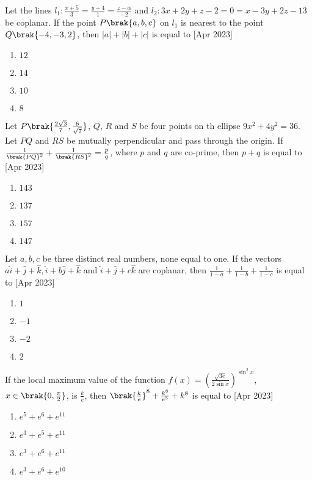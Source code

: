 \item Let the lines $l_1: \frac{x+5}{3}=\frac{y+4}{1}=\frac{z-\alpha}{-2}$ and $l_2: 3x+2y+z-2=0=x-3y+2z-13$ be coplanar. If the point $P\brak{a,b,c}$ on $l_1$ is nearest to the point $Q\brak{-4,-3,2}$, then $|a|+|b|+|c|$ is equal to \hfill[Apr 2023]
\begin{multicols}{2}
\begin{enumerate}
       \item $12$
       \item $14$
       \item $10$
       \item $8$
\end{enumerate}
\end{multicols}

\item Let $P\brak{\frac{2\sqrt{3}}{7},\frac{6}{\sqrt{7}}}$, $Q$, $R$ and $S$ be four points on th ellipse $9x^2+4y^2=36$. Let $PQ$ and $RS$ be mutually perpendicular and pass through the origin. If $\frac{1}{\brak{PQ}^2}+\frac{1}{\brak{RS}^2}=\frac{p}{q}$, where $p$ and $q$ are co-prime, then $p+q$ is equal to \hfill[Apr 2023]
\begin{multicols}{2}
\begin{enumerate}
    \item $143$
    \item $137$
    \item $157$
    \item $147$
\end{enumerate}
\end{multicols}

\item Let $a, b, c$ be three distinct real numbers, none equal to one. If the vectors $a\hat{i}+\hat{j}+\hat{k},\hat{i}+b\hat{j}+\hat{k}$ and $\hat{i}+\hat{j}+c\hat{k}$ are coplanar, then $\frac{1}{1-a}+\frac{1}{1-b}+\frac{1}{1-c}$ is equal to \hfill[Apr 2023]
\begin{multicols}{2}
\begin{enumerate}
    \item $1$
    \item $-1$
    \item $-2$
    \item $2$
\end{enumerate}
\end{multicols}

\item If the local maximum value of the function $f\left( x \right) = \left( \frac{\sqrt{3e}}{2 \sin{x}} \right)^{\sin^2{x}}$, $x\in \brak{0,\frac{\pi}{2}}$, is $\frac{k}{e}$, then $\brak{\frac{k}{e}}^8+\frac{k^8}{e^5}+k^8$ is equal to \hfill[Apr 2023]
\begin{multicols}{2}
\begin{enumerate}
    \item $e^5+e^6+e^{11}$
    \item $e^3+e^5+e^{11}$
    \item $e^3+e^6+e^{11}$
    \item $e^3+e^6+e^{10}$
\end{enumerate}
\end{multicols}

